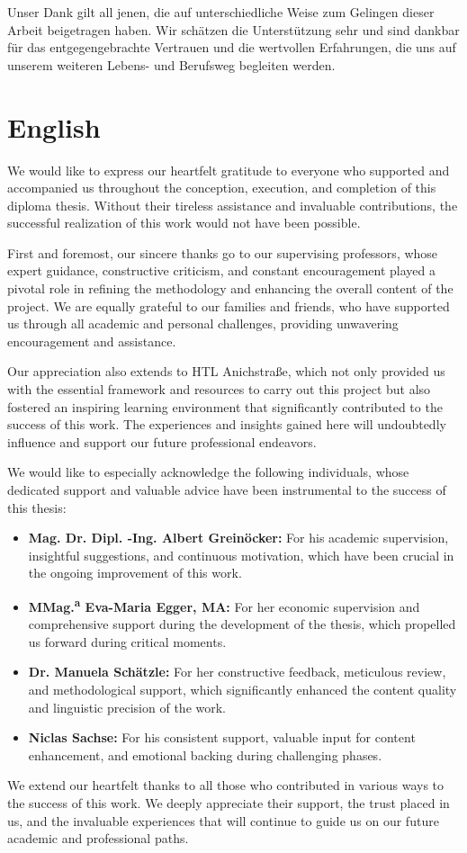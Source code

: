 Unser Dank gilt all jenen, die auf unterschiedliche Weise zum Gelingen dieser Arbeit beigetragen haben. Wir schätzen die Unterstützung sehr und sind dankbar für das entgegengebrachte Vertrauen und die wertvollen Erfahrungen, die uns auf unserem weiteren Lebens- und Berufsweg begleiten werden.

\section*{English}

We would like to express our heartfelt gratitude to everyone who supported and accompanied us throughout the conception, execution, and completion of this diploma thesis. Without their tireless assistance and invaluable contributions, the successful realization of this work would not have been possible.

First and foremost, our sincere thanks go to our supervising professors, whose expert guidance, constructive criticism, and constant encouragement played a pivotal role in refining the methodology and enhancing the overall content of the project. We are equally grateful to our families and friends, who have supported us through all academic and personal challenges, providing unwavering encouragement and assistance.

Our appreciation also extends to HTL Anichstraße, which not only provided us with the essential framework and resources to carry out this project but also fostered an inspiring learning environment that significantly contributed to the success of this work. The experiences and insights gained here will undoubtedly influence and support our future professional endeavors.

We would like to especially acknowledge the following individuals, whose dedicated support and valuable advice have been instrumental to the success of this thesis:
\begin{itemize}
    \item \textbf{Mag. Dr. Dipl. -Ing. Albert Greinöcker:} For his academic supervision, insightful suggestions, and continuous motivation, which have been crucial in the ongoing improvement of this work.
    \item \textbf{MMag.\textsuperscript{a} Eva-Maria Egger, MA:} For her economic supervision and comprehensive support during the development of the thesis, which propelled us forward during critical moments.
    \item \textbf{Dr. Manuela Schätzle:} For her constructive feedback, meticulous review, and methodological support, which significantly enhanced the content quality and linguistic precision of the work.
    \item \textbf{Niclas Sachse:} For his consistent support, valuable input for content enhancement, and emotional backing during challenging phases.
\end{itemize}


We extend our heartfelt thanks to all those who contributed in various ways to the success of this work. We deeply appreciate their support, the trust placed in us, and the invaluable experiences that will continue to guide us on our future academic and professional paths.

